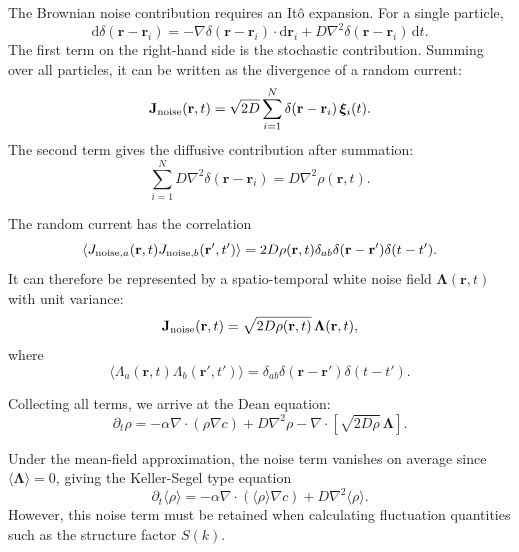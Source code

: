 \documentclass{article}
\begin{document}
The Brownian noise contribution requires an It\^{o} expansion. For a single particle,
\begin{equation}
    \mathrm{d}\delta(\mathbf r-\mathbf r_i) = -\nabla\delta(\mathbf r-\mathbf r_i)\cdot \mathrm{d}\mathbf r_i + D\nabla^2\delta(\mathbf r-\mathbf r_i)\,\mathrm{d}t.
\end{equation}
The first term on the right-hand side is the stochastic contribution. Summing over all particles, it can be written as the divergence of a random current:
\begin{equation}
    \mathbf J_{\rm noise}(\mathbf r,t) = \sqrt{2D}\sum_{i=1}^{N}\delta(\mathbf r-\mathbf r_i)\,\boldsymbol{\xi}_i(t).
\end{equation}
The second term gives the diffusive contribution after summation:
\begin{equation}
    \sum_{i=1}^{N}D\nabla^2\delta(\mathbf r-\mathbf r_i) = D\nabla^2\rho(\mathbf r,t).
\end{equation}

The random current has the correlation
\begin{equation}
    \langle J_{{\rm noise},a}(\mathbf r,t)J_{{\rm noise},b}(\mathbf r',t')\rangle = 2D\rho(\mathbf r,t)\delta_{ab}\delta(\mathbf r-\mathbf r')\delta(t-t').
\end{equation}
It can therefore be represented by a spatio-temporal white noise field $\boldsymbol{\Lambda}(\mathbf r,t)$ with unit variance:
\begin{equation}
    \mathbf J_{\rm noise}(\mathbf r,t) = \sqrt{2D\rho(\mathbf r,t)}\,\boldsymbol{\Lambda}(\mathbf r,t),
\end{equation}
where
\begin{equation}
    \langle \Lambda_a(\mathbf r,t)\Lambda_b(\mathbf r',t')\rangle = \delta_{ab}\delta(\mathbf r-\mathbf r')\delta(t-t').
\end{equation}

Collecting all terms, we arrive at the Dean equation:
\begin{equation}
    \boxed{\partial_t\rho = -\alpha\nabla\cdot(\rho\nabla c) + D\nabla^2\rho - \nabla\cdot\left[\sqrt{2D\rho}\,\boldsymbol{\Lambda}\right].}
    \label{eq:DeanEquation}
\end{equation}

Under the mean-field approximation, the noise term vanishes on average since $\langle\boldsymbol{\Lambda}\rangle=0$, giving the Keller-Segel type equation
\begin{equation}
    \partial_t\langle\rho\rangle = -\alpha\nabla\cdot(\langle\rho\rangle\nabla c) + D\nabla^2\langle\rho\rangle.
\end{equation}
However, this noise term must be retained when calculating fluctuation quantities such as the structure factor $S(k)$.
\end{document}
